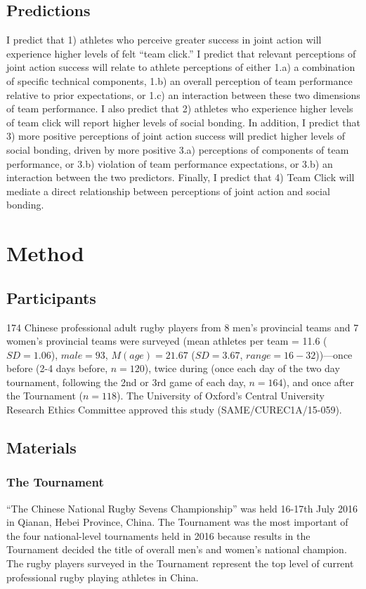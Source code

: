 \subsection{Predictions}
I predict that 1) athletes who perceive greater success in joint action will experience higher levels of felt  ``team click.'' I predict that relevant perceptions of joint action success will relate to athlete perceptions of either 1.a) a combination of specific technical components, 1.b) an overall perception of team performance relative to prior expectations, or 1.c) an interaction between these two dimensions of team performance.  I also predict that 2) athletes who experience higher levels of team click will report higher levels of social bonding. In addition, I predict that 3) more positive perceptions of joint action success will predict higher levels of social bonding, driven by more positive 3.a) perceptions of components of team performance, or 3.b) violation of team performance expectations, or 3.b) an interaction between the two predictors.  Finally, I predict that 4) Team Click will mediate a direct relationship between perceptions of joint action and social bonding.

\section{Method}
\subsection{Participants}
174 Chinese professional adult rugby players from 8 men’s provincial teams and 7 women’s provincial teams were surveyed  (mean athletes per team = 11.6 ($SD =1.06$), $male = 93$, $M(age) = 21.67$ ($SD = 3.67$, $range = 16 - 32$))---once before (2-4 days before, $n = 120$), twice during (once each day of the two day tournament, following the 2nd or 3rd game of each day, $n = 164$), and once after the Tournament ($n = 118$).  The University of Oxford’s Central University Research Ethics Committee approved this study (SAME/CUREC1A/15-059).

\subsection{Materials}
\subsubsection{The Tournament}
``The Chinese National Rugby Sevens Championship'' was held 16-17th July 2016 in Qianan, Hebei Province, China. The Tournament was the most important of the four national-level tournaments held in 2016 because results in the Tournament decided the title of overall men's and women’s national champion. The rugby players surveyed in the Tournament represent the top level of current professional rugby playing athletes in China.

